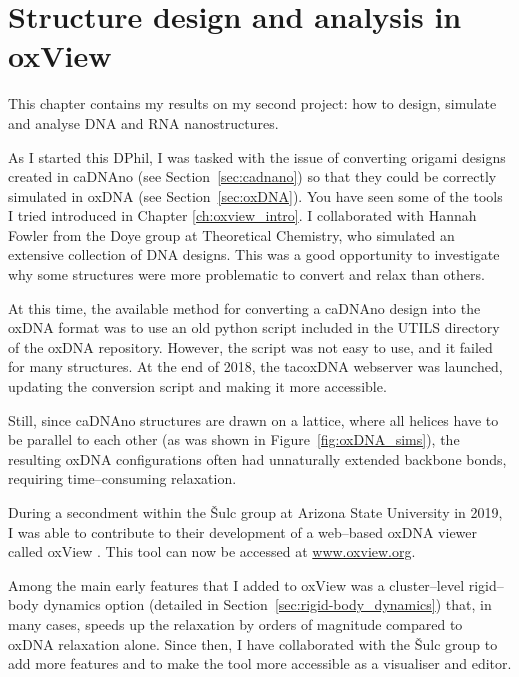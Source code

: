 \chapter{\label{ch:oxview}Structure design and analysis in oxView}

\minitoc


This chapter contains my results on my second project: how to design, simulate and analyse DNA and RNA nanostructures.

As I started this DPhil, I was tasked with the issue of converting origami designs created in caDNAno (see Section~\ref{sec:cadnano}) so that they could be correctly simulated in oxDNA (see Section~\ref{sec:oxDNA}). You have seen some of the tools I tried introduced in Chapter \ref{ch:oxview_intro}. I collaborated with Hannah Fowler from the Doye group at Theoretical Chemistry, who simulated an extensive collection of DNA designs. This was a good opportunity to investigate why some structures were more problematic to convert and relax than others.

At this time, the available method for converting a caDNAno design into the oxDNA format was to use an old python script included in the UTILS directory of the oxDNA repository. However, the script was not easy to use, and it failed for many structures. At the end of 2018, the tacoxDNA webserver \cite{suma2019tacoxdna} was launched, updating the conversion script and making it more accessible.

Still, since caDNAno structures are drawn on a lattice, where all helices have to be parallel to each other (as was shown in Figure~\ref{fig:oxDNA_sims}), the resulting oxDNA configurations often had unnaturally extended backbone bonds, requiring time--consuming relaxation.

During a secondment within the {\v{S}}ulc group at Arizona State University in 2019, I was able to contribute to their development of a web--based oxDNA viewer called oxView \cite{poppleton2020design, bohlin2022oxview}. This tool can now be accessed at {\large\url{www.oxview.org}}.

Among the main early features that I added to oxView was a cluster--level rigid--body dynamics option (detailed in Section~\ref{sec:rigid-body_dynamics}) that, in many cases, speeds up the relaxation by orders of magnitude compared to oxDNA relaxation alone. Since then, I have collaborated with the {\v{S}}ulc group to add more features and to make the tool more accessible as a visualiser and editor. 

